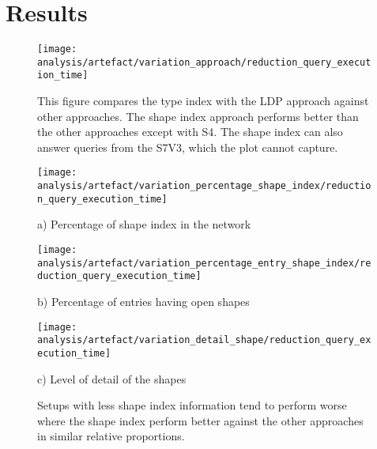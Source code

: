 \section{Results}


\begin{figure}[h]
    \centering
    \texttt{[image: analysis/artefact/variation\_approach/reduction\_query\_execution\_time]}
    \caption{
        This figure compares the type index with the LDP approach against other approaches.
        The shape index approach performs better than the other approaches except with S4.
        The shape index can also answer queries from the S7V3, which the plot cannot capture.
    }
    \label{fig:compApproach}
\end{figure}

\begin{figure}[htbp]
    \centering
    \begin{minipage}{0.32\textwidth}
        \centering
        \texttt{[image: analysis/artefact/variation\_percentage\_shape\_index/reduction\_query\_execution\_time]}
        \caption*{a) Percentage of shape index in the network}
        \label{fig:varPercentShapeIndex}
    \end{minipage}
    \hfill
    \begin{minipage}{0.32\textwidth}
        \centering
        \texttt{[image: analysis/artefact/variation\_percentage\_entry\_shape\_index/reduction\_query\_execution\_time]}
        \caption*{b) Percentage of entries having open shapes}
        \label{fig:varPercentEntries}
    \end{minipage}
    \hfill
    \begin{minipage}{0.32\textwidth}
        \centering
        \texttt{[image: analysis/artefact/variation\_detail\_shape/reduction\_query\_execution\_time]}
        \caption*{c) Level of detail of the shapes}
        \label{fig:varShapeDetail}
    \end{minipage}

    \caption{Setups with less shape index information tend to perform worse where the shape index perform
    better against the other approaches in similar relative proportions.
    }
    \label{fig:three_figures}
\end{figure}

